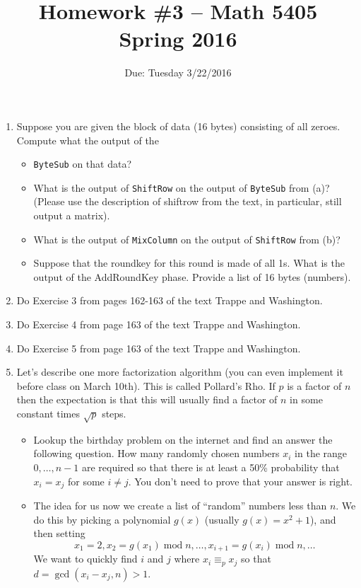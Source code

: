 \documentclass[11pt]{amsart}
\begin{document}
\title{Homework \#3 -- Math 5405\\Spring 2016}
\author{Due: Tuesday  3/22/2016}
\maketitle
\begin{enumerate}
\item Suppose you are given the block of data (16 bytes) consisting of all zeroes.  Compute what the output of the 
\begin{itemize}
\item[(a)]  {\tt ByteSub} on that data?
\item[(b)]  What is the output of {\tt ShiftRow} on the output of {\tt ByteSub} from (a)?  (Please use the description of shiftrow from the text, in particular, still output a matrix).
\item[(c)]  What is the output of {\tt MixColumn} on the output of {\tt ShiftRow} from (b)?
\item[(d)]  Suppose that the roundkey for this round is made of all 1s.  What is the output of the AddRoundKey phase.  Provide a list of 16 bytes (numbers).
\end{itemize}
\item Do Exercise 3 from pages 162-163 of the text Trappe and Washington.
\item Do Exercise 4 from page 163 of the text Trappe and Washington.
\item Do Exercise 5 from page 163 of the text Trappe and Washington. 
\item Let's describe one more factorization algorithm (you can even implement it before class on March 10th).  This is called Pollard's Rho.  If $p$ is a factor of $n$ then the expectation is that this will usually find a factor of $n$ in some constant times $\sqrt{p}$ steps.
    \begin{itemize}
    \item[(a)]  Lookup the birthday problem on the internet and find an answer the following question.  How many randomly chosen numbers $x_i$ in the range $0, \ldots, n-1$ are required so that there is at least a 50\% probability that $x_i = x_j$ for some $i \neq j$.  You don't need to prove that your answer is right.
    \item[(b)]  The idea for us now we create a list of ``random'' numbers less than $n$.  We do this by picking a polynomial $g(x)$ (usually $g(x) = x^2 + 1$), and then setting 
    \[
        x_1 = 2, x_2 = g(x_1) \;\text{mod}\;n, \ldots, x_{i+1} = g(x_i) \;\text{mod}\;n, \ldots
    \]
    We want to quickly find $i$ and $j$ where $x_i \equiv_p x_j$ so that $d = \gcd(x_i - x_j, n) > 1$.  
    

\end{itemize}
\end{enumerate}
\end{document}
